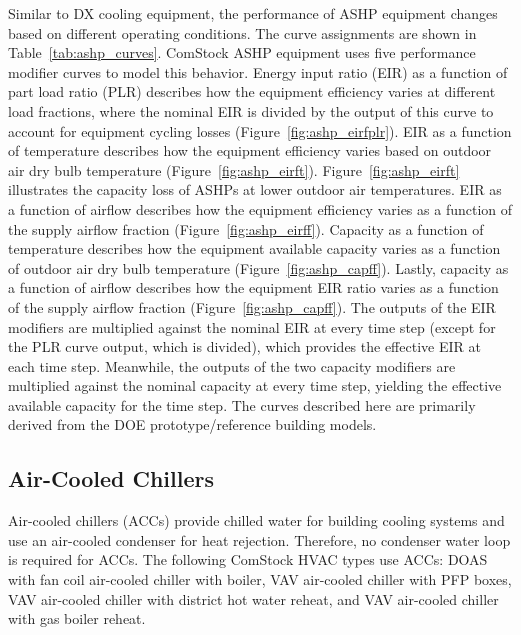 Similar to DX cooling equipment, the performance of ASHP equipment changes based on different operating conditions. The curve assignments are shown in Table~\ref{tab:ashp_curves}. ComStock ASHP equipment uses five performance modifier curves to model this behavior. Energy input ratio (EIR) as a function of part load ratio (PLR) describes how the equipment efficiency varies at different load fractions, where the nominal EIR is divided by the output of this curve to account for equipment cycling losses (Figure~\ref{fig:ashp_eirfplr}). EIR as a function of temperature describes how the equipment efficiency varies based on outdoor air dry bulb temperature (Figure~\ref{fig:ashp_eirft}). Figure~\ref{fig:ashp_eirft} illustrates the capacity loss of ASHPs at lower outdoor air temperatures. EIR as a function of airflow describes how the equipment efficiency varies as a function of the supply airflow fraction (Figure~\ref{fig:ashp_eirff}). Capacity as a function of temperature describes how the equipment available capacity varies as a function of outdoor air dry bulb temperature (Figure~\ref{fig:ashp_capff}). Lastly, capacity as a function of airflow describes how the equipment EIR ratio varies as a function of the supply airflow fraction (Figure~\ref{fig:ashp_capff}). The outputs of the EIR modifiers are multiplied against the nominal EIR at every time step (except for the PLR curve output, which is divided), which provides the effective EIR at each time step. Meanwhile, the outputs of the two capacity modifiers are multiplied against the nominal capacity at every time step, yielding the effective available capacity for the time step. The curves described here are primarily derived from the DOE prototype/reference building models.


\subsection{Air-Cooled Chillers}

Air-cooled chillers (ACCs) provide chilled water for building cooling systems and use an air-cooled condenser for heat rejection. Therefore, no condenser water loop is required for ACCs. The following ComStock HVAC types use ACCs: DOAS with fan coil air-cooled chiller with boiler, VAV air-cooled chiller with PFP boxes, VAV air-cooled chiller with district hot water reheat, and VAV air-cooled chiller with gas boiler reheat.


